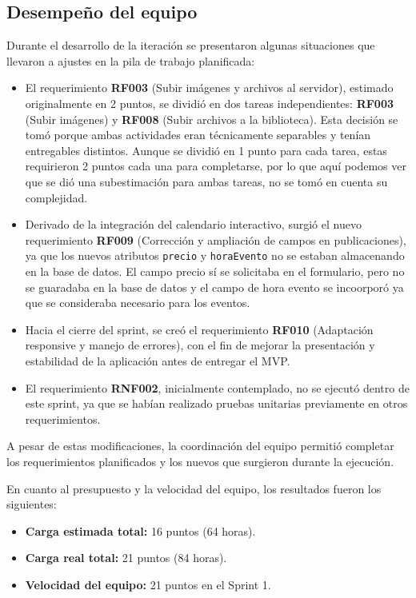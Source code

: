 \subsection{Desempeño del equipo}

Durante el desarrollo de la iteración se presentaron algunas situaciones que llevaron a ajustes en la pila de trabajo planificada:

\begin{itemize}
    \item El requerimiento \textbf{RF003} (Subir imágenes y archivos al servidor), estimado originalmente en 2 puntos, se dividió en dos tareas independientes: \textbf{RF003} (Subir imágenes) y \textbf{RF008} (Subir archivos a la biblioteca). Esta decisión se tomó porque ambas actividades eran técnicamente separables y tenían entregables distintos. Aunque se dividió en 1 punto para cada tarea, estas requirieron 2 puntos cada una para completarse, por lo que aquí podemos ver que se dió una subestimación para ambas tareas, no se tomó en cuenta su complejidad.
    \item Derivado de la integración del calendario interactivo, surgió el nuevo requerimiento \textbf{RF009} (Corrección y ampliación de campos en publicaciones), ya que los nuevos atributos \texttt{precio} y \texttt{horaEvento} no se estaban almacenando en la base de datos. El campo precio sí se solicitaba en el formulario, pero no se guaradaba en la base de datos y el campo de hora evento se incoorporó ya que se consideraba necesario para los eventos.
    \item Hacia el cierre del sprint, se creó el requerimiento \textbf{RF010} (Adaptación responsive y manejo de errores), con el fin de mejorar la presentación y estabilidad de la aplicación antes de entregar el MVP.
    \item El requerimiento \textbf{RNF002}, inicialmente contemplado, no se ejecutó dentro de este sprint, ya que se habían realizado pruebas unitarias previamente en otros requerimientos.
\end{itemize}

A pesar de estas modificaciones, la coordinación del equipo permitió completar los requerimientos planificados y los nuevos que surgieron durante la ejecución.

En cuanto al presupuesto y la velocidad del equipo, los resultados fueron los siguientes:

\begin{itemize}
    \item \textbf{Carga estimada total:} 16 puntos (64 horas).
    \item \textbf{Carga real total:} 21 puntos (84 horas).
    \item \textbf{Velocidad del equipo:} 21 puntos en el Sprint 1.
\end{itemize}

